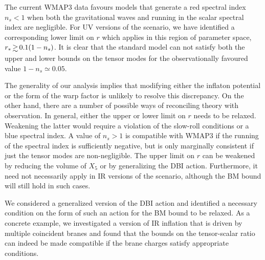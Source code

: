 The current WMAP3 data 
favours models that generate a red spectral index $n_s<1$
when both the gravitational waves and running in the scalar 
spectral index are negligible. For UV versions of the scenario, 
we have identified a corresponding 
lower limit on $r$ which applies in this region of 
parameter space, $r_* \, \gsim \, 0.1 (1-n_s)$. It is clear that 
the standard model 
can not satisfy both the upper and lower bounds 
on the tensor modes for the observationally favoured value 
$1-n_s \simeq 0.05$.


The generality of our 
analysis implies that modifying either the inflaton potential 
or the form of the warp factor is unlikely to resolve this discrepancy. 
On the other hand, there are a number of possible ways of reconciling  
theory with observation. In general, 
either the upper or lower limit on $r$ needs to be relaxed. 
Weakening the latter would require a violation of the slow-roll 
conditions or a blue spectral index. 
A value of $n_s >1$ is compatible with WMAP3 if the running of the 
spectral index 
is sufficiently negative, but is only marginally
consistent if just the tensor modes are non-negligible.  The 
upper limit on $r$ can be weakened by reducing 
the volume of $X_5$ or 
by generalizing the DBI action. Furthermore, it need not necessarily 
apply in IR versions of the scenario, although the BM bound will still hold
in such cases. 


We considered a generalized version of the 
DBI action and identified a necessary condition on the form of such  
an action for the BM bound to be relaxed.
As a concrete example, 
we investigated a version of IR inflation that is driven by 
multiple coincident branes and found that  
the bounds on the tensor-scalar ratio can indeed 
be made compatible if the brane charges satisfy appropriate 
conditions.   


